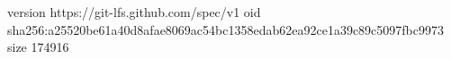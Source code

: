 version https://git-lfs.github.com/spec/v1
oid sha256:a25520be61a40d8afae8069ac54bc1358edab62ea92ce1a39c89c5097fbc9973
size 174916
